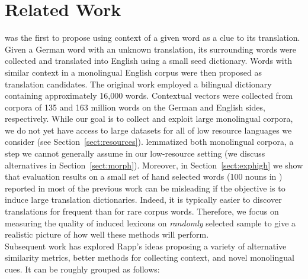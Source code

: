 \documentclass{article}
\newcommand{\secref}[1]{Section~\ref{#1}}
\begin{document}
\section{Related Work} \label{sect:relwork}


\cite{Rapp:1995} was the first to propose using context of a given word as a clue to its translation. Given a German word with an unknown translation, its surrounding words were collected and translated into English using a small seed dictionary.  Words with similar context in a monolingual English corpus were then proposed as translation candidates.  The original work employed a bilingual dictionary containing approximately 16,000 words.  Contextual vectors were collected from corpora of 135 and 163 million words on the German and English sides, respectively.  While our goal is to collect and exploit large monolingual corpora, we do not yet have access to large datasets for all of low resource languages we consider (see \secref{sect:resources}). \cite{Rapp:1995} lemmatized both monolingual corpora, a step we cannot generally assume in our low-resource setting (we discuss alternatives in \secref{sect:morph}).  Moreover, in \secref{sect:exphigh} we show  that evaluation results on a small set of hand selected words (100 nouns in \cite{Rapp:1995}) reported in most of the previous work can be misleading if the objective is to induce large translation dictionaries.  Indeed, it is typically easier to discover translations for frequent than for rare corpus words.  Therefore, we focus on measuring the quality of induced lexicons on {\em randomly} selected sample to give a realistic picture of how well these methods will perform.\\

Subsequent work has explored Rapp's ideas proposing a variety of alternative similarity metrics, better methods for collecting context, and novel monolingual cues.  It can be roughly grouped as follows:
\end{document}
